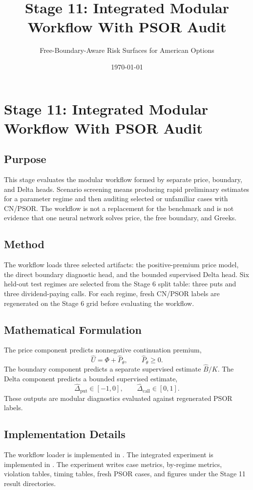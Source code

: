 \documentclass[11pt]{article}
\title{Stage 11: Integrated Modular Workflow With PSOR Audit}
\author{Free-Boundary-Aware Risk Surfaces for American Options}
\date{\today}
\begin{document}
\maketitle

\section{Stage 11: Integrated Modular Workflow With PSOR Audit}

\subsection{Purpose}
This stage evaluates the modular workflow formed by separate price, boundary,
and Delta heads. Scenario screening means producing rapid preliminary
estimates for a parameter regime and then auditing selected or unfamiliar cases
with CN/PSOR. The workflow is not a replacement for the benchmark and is not
evidence that one neural network solves price, the free boundary, and Greeks.

\subsection{Method}
The workflow loads three selected artifacts: the positive-premium price model, the direct boundary diagnostic head, and the bounded supervised Delta head. Six held-out test regimes are selected from the Stage 6 split table: three puts and three dividend-paying calls. For each regime, fresh CN/PSOR labels are regenerated on the Stage 6 grid before evaluating the workflow.

\subsection{Mathematical Formulation}
The price component predicts nonnegative continuation premium,
\[
\widehat{U}=\Phi+\widehat{P}_{\theta}, \qquad \widehat{P}_{\theta}\geq 0.
\]
The boundary component predicts a separate supervised estimate $\widehat{B}/K$. The Delta component predicts a bounded supervised estimate,
\[
\widehat{\Delta}_{\mathrm{put}}\in[-1,0], \qquad
\widehat{\Delta}_{\mathrm{call}}\in[0,1].
\]
These outputs are modular diagnostics evaluated against regenerated PSOR labels.

\subsection{Implementation Details}
The workflow loader is implemented in . The integrated experiment is implemented in . The experiment writes case metrics, by-regime metrics, violation tables, timing tables, fresh PSOR cases, and figures under the Stage 11 result directories.
\end{document}
